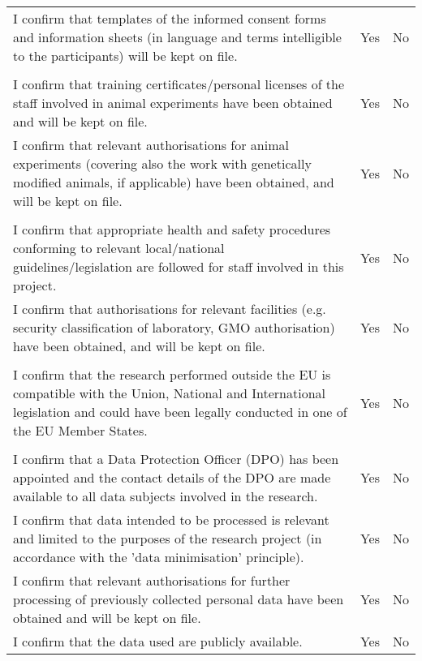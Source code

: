 \begin{table}[h!]
{\fontsize{9bp}{1em}\selectfont %
\noindent\begin{tabular}{|>{\raggedright}p{}|cc|}\hline
\multicolumn{3}{|l|}{\cellcolor{gray!50} \textbf{Humans}} \\\hline
I confirm that templates of the informed consent forms and information
sheets (in language and terms intelligible to the participants) will be kept on file.
& Yes & No \\\hline
\multicolumn{3}{|l|}{\cellcolor{gray!50} \textbf{Animals}} \\\hline
I confirm that training certificates/personal licenses of the staff involved in
animal experiments have been obtained and will be kept on file.
& Yes & No \\\hline
I confirm that relevant authorisations for animal experiments (covering also
the work with genetically modified animals, if applicable) have been
obtained, and will be kept on file.
& Yes & No \\\hline
\multicolumn{3}{|l|}{\cellcolor{gray!50} \textbf{Environmental protection and safety}} \\\hline
I confirm that appropriate health and safety procedures conforming to
relevant local/national guidelines/legislation are followed for staff involved
in this project.
& Yes & No \\\hline
I confirm that authorisations for relevant facilities (e.g. security
classification of laboratory, GMO authorisation) have been obtained, and
will be kept on file.
& Yes & No \\\hline
\multicolumn{3}{|l|}{\cellcolor{gray!50} \textbf{Third country}} \\\hline
I confirm that the research performed outside the EU is compatible with
the Union, National and International legislation and could have been
legally conducted in one of the EU Member States.
& Yes & No \\\hline
\multicolumn{3}{|l|}{\cellcolor{gray!50} \textbf{Data protection}} \\\hline
I confirm that a Data Protection Officer (DPO) has been appointed and the
contact details of the DPO are made available to all data subjects involved
in the research.
& Yes & No \\\hline
I confirm that data intended to be processed is relevant and limited to the
purposes of the research project (in accordance with the 'data minimisation'
principle).
& Yes & No \\\hline
I confirm that relevant authorisations for further processing of previously
collected personal data have been obtained and will be kept on file.
& Yes & No \\\hline
I confirm that the data used are publicly available.
& Yes & No \\\hline
\end{tabular}}
\end{table}




